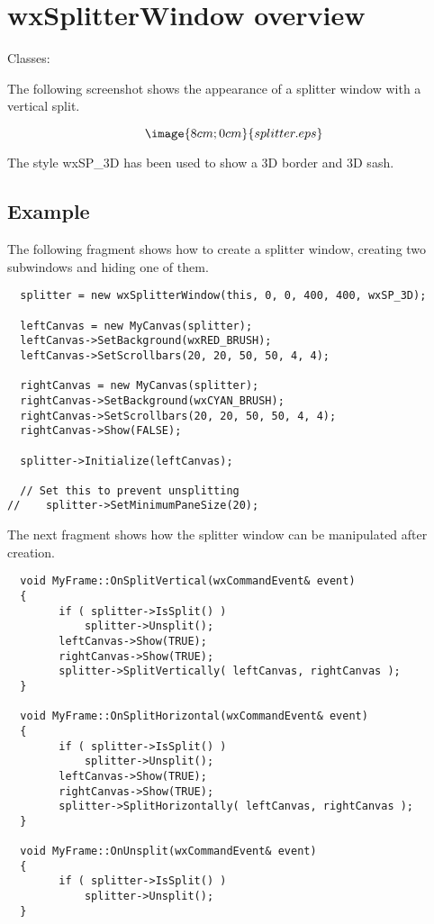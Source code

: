 \section{wxSplitterWindow overview}\label{wxsplitterwindowoverview}

Classes: 

The following screenshot shows the appearance of a splitter window with a vertical split.

$$\image{8cm;0cm}{splitter.eps}$$

The style wxSP\_3D has been used to show a 3D border and 3D sash.

\subsection{Example}

The following fragment shows how to create a splitter window, creating two
subwindows and hiding one of them.

{\small
\begin{verbatim}
  splitter = new wxSplitterWindow(this, 0, 0, 400, 400, wxSP_3D);

  leftCanvas = new MyCanvas(splitter);
  leftCanvas->SetBackground(wxRED_BRUSH);
  leftCanvas->SetScrollbars(20, 20, 50, 50, 4, 4);

  rightCanvas = new MyCanvas(splitter);
  rightCanvas->SetBackground(wxCYAN_BRUSH);
  rightCanvas->SetScrollbars(20, 20, 50, 50, 4, 4);
  rightCanvas->Show(FALSE);

  splitter->Initialize(leftCanvas);

  // Set this to prevent unsplitting
//    splitter->SetMinimumPaneSize(20);
\end{verbatim}
}

The next fragment shows how the splitter window can be manipulated after creation.

{\small
\begin{verbatim}
  void MyFrame::OnSplitVertical(wxCommandEvent& event)
  {
        if ( splitter->IsSplit() )
            splitter->Unsplit();
        leftCanvas->Show(TRUE);
        rightCanvas->Show(TRUE);
        splitter->SplitVertically( leftCanvas, rightCanvas );
  }

  void MyFrame::OnSplitHorizontal(wxCommandEvent& event)
  {
        if ( splitter->IsSplit() )
            splitter->Unsplit();
        leftCanvas->Show(TRUE);
        rightCanvas->Show(TRUE);
        splitter->SplitHorizontally( leftCanvas, rightCanvas );
  }

  void MyFrame::OnUnsplit(wxCommandEvent& event)
  {
        if ( splitter->IsSplit() )
            splitter->Unsplit();
  }
\end{verbatim}
}

